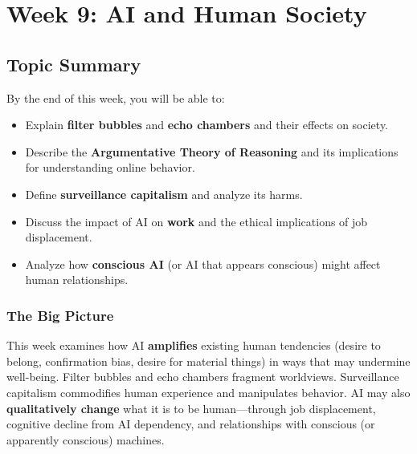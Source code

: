 \section{Week 9: AI and Human Society}

\subsection{Topic Summary}

\begin{keybox}
By the end of this week, you will be able to:
\begin{itemize}
  \item Explain \textbf{filter bubbles} and \textbf{echo chambers} and their effects on society.
  \item Describe the \textbf{Argumentative Theory of Reasoning} and its implications for understanding online behavior.
  \item Define \textbf{surveillance capitalism} and analyze its harms.
  \item Discuss the impact of AI on \textbf{work} and the ethical implications of job displacement.
  \item Analyze how \textbf{conscious AI} (or AI that appears conscious) might affect human relationships.
\end{itemize}
\end{keybox}

\separator

\subsubsection*{The Big Picture}

This week examines how AI \textbf{amplifies} existing human tendencies (desire to belong, confirmation bias, desire for material things) in ways that may undermine well-being. Filter bubbles and echo chambers fragment worldviews. Surveillance capitalism commodifies human experience and manipulates behavior. AI may also \textbf{qualitatively change} what it is to be human---through job displacement, cognitive decline from AI dependency, and relationships with conscious (or apparently conscious) machines.

